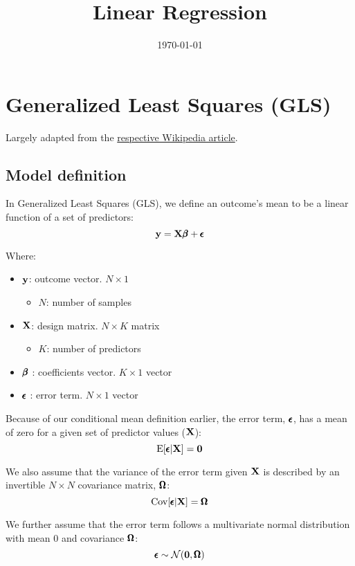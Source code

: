 \documentclass[12pt]{article}
\title{Linear Regression}
\date{\today}
\begin{document}
\maketitle

\section{Generalized Least Squares (GLS)}

Largely adapted from the \href{https://en.wikipedia.org/wiki/Generalized_least_squares}{respective Wikipedia article}.

\subsection{Model definition}

In Generalized Least Squares (GLS), we define an outcome's mean to be a linear function of a set of predictors:
$$ \mathbf{y} = \mathbf{X} \pmb{\beta} + \pmb{\epsilon} $$

Where:

\begin{itemize}
    \item $\mathbf{y}$: outcome vector. $N \times 1$
    \begin{itemize}
        \item $N$: number of samples
    \end{itemize}
    \item $\mathbf{X}$: design matrix. $N \times K$ matrix
    \begin{itemize}
        \item $K$: number of predictors
    \end{itemize}
    \item $\pmb{\beta}$ : coefficients vector. $K \times 1$ vector
    \item $\pmb{\epsilon}$ : error term. $N \times 1$ vector
\end{itemize}

Because of our conditional mean definition earlier, the error term, $\pmb{\epsilon}$, has a mean of zero for a given set of predictor values ($\mathbf{X}$):
$$ \mathrm{E} [\pmb{\epsilon} | \mathbf{X} ] = \mathbf{0} $$

We also assume that the variance of the error term given $\mathbf{X}$ is described by an invertible $N \times N$ covariance matrix, $\pmb{\Omega}$:
$$ \mathrm{Cov}[ \pmb{\epsilon} | \mathbf{X} ] = \pmb{\Omega} $$

We further assume that the error term follows a multivariate normal distribution with mean 0 and covariance $\pmb{\Omega}$:
$$ \pmb{\epsilon} \sim \mathcal{N} (\mathbf{0}, \pmb{\Omega}) $$
\end{document}
